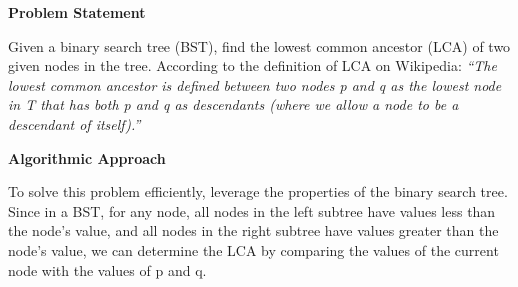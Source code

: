 

\textbf{Problem Statement}

Given a binary search tree (BST), find the lowest common ancestor (LCA) of two given nodes in the tree. According to the definition of LCA on Wikipedia: \textit{“The lowest common ancestor is defined between two nodes p and q as the lowest node in T that has both p and q as descendants (where we allow a node to be a descendant of itself).”}

\textbf{Algorithmic Approach}

To solve this problem efficiently, leverage the properties of the binary search tree. Since in a BST, for any node, all nodes in the left subtree have values less than the node's value, and all nodes in the right subtree have values greater than the node's value, we can determine the LCA by comparing the values of the current node with the values of p and q.

